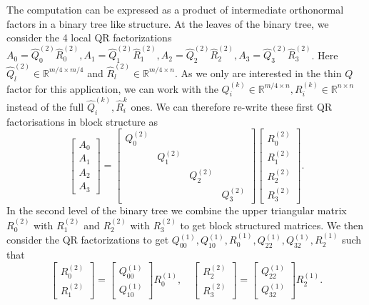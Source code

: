 \documentclass[a4paper, 12pt,oneside]{article}
\begin{document}
		The computation can be expressed as a product of intermediate orthonormal factors in a binary tree like structure.
		At the leaves of the binary tree, we consider the 4 local QR factorizations $A_0=\hat{Q}_0^{(2)} \hat{R}_0^{(2)}, A_1=\hat{Q}_1^{(2)} \hat{R}_1^{(2)}, A_2=\hat{Q}_2^{(2)} \hat{R}_2^{(2)}, A_3=\hat{Q}_3^{(2)} \hat{R}_3^{(2)}$. Here $\hat{Q}_l^{(2)} \in \mathbb{R}^{m / 4 \times m / 4}$ and $\hat{R}_l^{(2)} \in \mathbb{R}^{m / 4 \times n}$. As we only are interested in the thin $Q$ factor for this application, we can work with the $Q_i^{(k)}\in\mathbb R^{m/4\times n}, R_i^{(k)}\in\mathbb R^{n\times n}$ instead of the full $\hat Q_i^{(k)}, \hat R_i^{k}$ ones. We can therefore re-write these first QR factorisations in block structure as 
		$$
		\left[\begin{array}{l}
		A_0 \\
		A_1 \\
		A_2 \\
		A_3
		\end{array}\right]=\left[\begin{array}{llll}
		{Q}_0^{(2)} & & & \\
		& {Q}_1^{(2)} & & \\
		& & {Q}_2^{(2)} & \\
		& & & {Q}_3^{(2)}
		\end{array}\right]\left[\begin{array}{l}
		{R}_0^{(2)} \\
		{R}_1^{(2)} \\
		{R}_2^{(2)} \\
		{R}_3^{(2)}
		\end{array}\right].
		$$
		In the second level of the binary tree we combine the upper triangular matrix $R_0^{(2)}$ with $R_1^{(2)}$ and $R_2^{(2)}$ with $R_3^{(2)}$ to get block structured matrices. We then consider the QR factorizations to get $Q_{00}^{(1)},Q_{10}^{(1)},R_0^{(1)},Q_{22}^{(1)},Q_{32}^{(1)},R_2^{(1)}$ such that
		$$
		\left[\begin{array}{c}
		R_0^{(2)} \\
		R_1^{(2)}
		\end{array}\right]=\left[\begin{array}{c}
		{Q}_{00}^{(1)} \\
		{Q}_{10}^{(1)} 
		\end{array}\right]
		R_0^{(1)},
		\quad\left[\begin{array}{c}
		R_2^{(2)} \\
		R_3^{(2)}
		\end{array}\right]=\left[\begin{array}{c}
		{Q}_{22}^{(1)} \\
		{Q}_{32}^{(1)}
		\end{array}\right]
		R_2^{(1)}.
		$$
\end{document}
